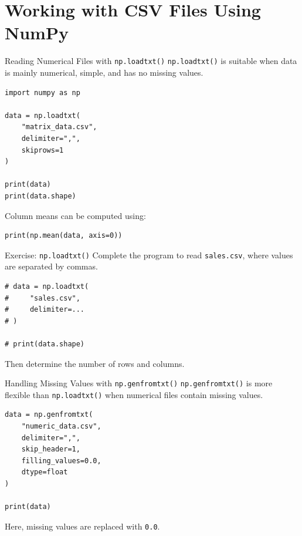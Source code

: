 \documentclass[aspectratio=169,11pt]{beamer}
\newcommand{\code}[1]{\texttt{#1}}
\begin{document}
\section{Working with CSV Files Using NumPy}

\begin{frame}[fragile]{Reading Numerical Files with \code{np.loadtxt()}}
\code{np.loadtxt()} is suitable when data is mainly numerical, simple, and has no missing values.

\begin{lstlisting}[style=pythonstyle]
import numpy as np

data = np.loadtxt(
    "matrix_data.csv",
    delimiter=",",
    skiprows=1
)

print(data)
print(data.shape)
\end{lstlisting}

Column means can be computed using:
\begin{lstlisting}[style=pythonstyle]
print(np.mean(data, axis=0))
\end{lstlisting}
\end{frame}

\begin{frame}[fragile]{Exercise: \code{np.loadtxt()}}
Complete the program to read \code{sales.csv}, where values are separated by commas.

\begin{lstlisting}[style=pythonstyle]
# data = np.loadtxt(
#     "sales.csv",
#     delimiter=...
# )

# print(data.shape)
\end{lstlisting}

Then determine the number of rows and columns.
\end{frame}

\begin{frame}[fragile]{Handling Missing Values with \code{np.genfromtxt()}}
\code{np.genfromtxt()} is more flexible than \code{np.loadtxt()} when numerical files contain missing values.

\begin{lstlisting}[style=pythonstyle]
data = np.genfromtxt(
    "numeric_data.csv",
    delimiter=",",
    skip_header=1,
    filling_values=0.0,
    dtype=float
)

print(data)
\end{lstlisting}

Here, missing values are replaced with \code{0.0}.
\end{frame}
\end{document}
